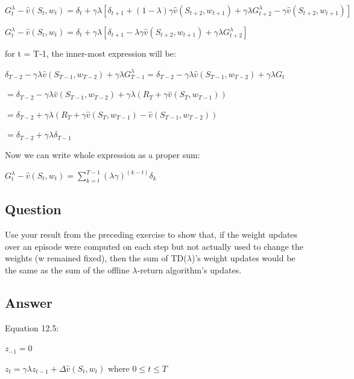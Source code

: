 \documentclass[11pt]{article}
\begin{document}
    \noindent $ G_{t}^{\lambda} - \hat{v}(S_t, w_t) = \delta_{t} +  \gamma \lambda [ \delta_{t+1} + (1-\lambda) \gamma \hat{v}(S_{t+2},w_{t+1}) +  \gamma \lambda G_{t+2}^\lambda - \gamma \hat{v}(S_{t+2},w_{t+1})] $

    \noindent $ G_{t}^{\lambda} - \hat{v}(S_t, w_t) = \delta_{t} +  \gamma \lambda [ \delta_{t+1} -\lambda \gamma \hat{v}(S_{t+2},w_{t+1}) +  \gamma \lambda G_{t+2}^\lambda] $

    \hfill \break
    \noindent for t = T-1, the inner-most expression will be:

    \noindent $ \delta_{T-2} - \gamma \lambda \hat{v}(S_{T-1}, w_{T-2}) + \gamma \lambda G_{T-1}^\lambda = \delta_{T-2} - \gamma \lambda \hat{v}(S_{T-1}, w_{T-2}) + \gamma \lambda G_t $

    \noindent $ = \delta_{T-2} - \gamma \lambda \hat{v}(S_{T-1}, w_{T-2}) + \gamma \lambda (R_T + \gamma \hat{v}(S_{T}, w_{T-1}) ) $

    \noindent $ = \delta_{T-2} + \gamma \lambda (R_T + \gamma \hat{v}(S_{T}, w_{T-1}) - \hat{v}(S_{T-1}, w_{T-2}) ) $

    \noindent $ = \delta_{T-2} + \gamma \lambda \delta_{T-1} $

    \hfill \break
    \noindent Now we can write whole expression as a proper sum:

    \noindent $ G_{t}^{\lambda} - \hat{v}(S_t, w_t) = \sum_{k=t}^{T-1} (\lambda \gamma)^{(k-t)} \delta_{k} $

    \subsection{Question}

    Use your result from the preceding exercise to show that, if the weight updates over an episode were computed on each step but not actually used to change the weights (w remained fixed),
    then the sum of TD($\lambda$)’s weight updates would be the same as the sum of the offline $\lambda$-return algorithm’s updates.

    \subsection*{Answer}

    \noindent Equation 12.5:

    \noindent $ z_{-1} = 0 $

    \noindent $ z_{t} = \gamma \lambda z_{t-1} + \Delta \hat{v}(S_t, w_t) $ where $ 0 \le t \le T $
\end{document}
